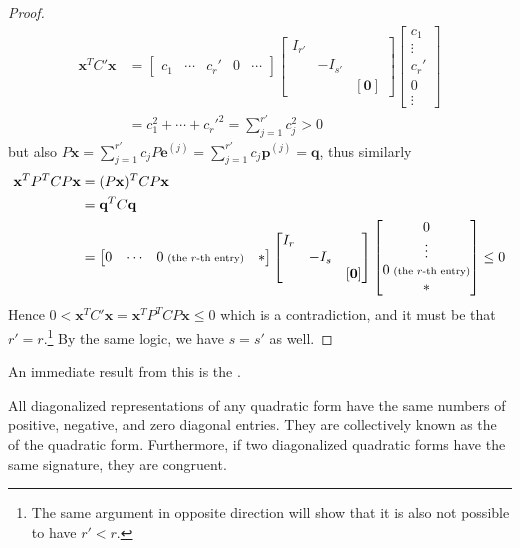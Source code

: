 \begin{proof}
\begin{align*}
\textbf{x}^T C'\textbf{x} &= 
\begin{bmatrix}
c_1 & \cdots & c_r' & 0 & \cdots  
\end{bmatrix}
\begin{bmatrix}
I_{r'} & & \\
& -I_{s'} &  \\
& & [\textbf{0}]
\end{bmatrix}
\begin{bmatrix}
c_1 \\
\vdots \\
c_r' \\
0 \\
\vdots
\end{bmatrix} \\
&= c_1^2 + \cdots + c_r'^2 = \sum_{j=1}^{r'} c_j^2 > 0   
\end{align*}
but also $P\textbf{x} = \sum_{j=1}^{r'} c_j P\textbf{e}^{(j)} = \sum_{j=1}^{r'} c_j \textbf{p}^{(j)} = \textbf{q}$, thus similarly
\begin{align*}
\textbf{x}^T P^T C P\textbf{x} &= (P\textbf{x})^T C P\textbf{x} \\
&= \textbf{q}^T C \textbf{q} \\
&= 
\begin{bmatrix}
0 & \cdots & 0 {\scriptsize \text{ (the $r$-th entry)}} & *
\end{bmatrix}
\begin{bmatrix}
I_r & & \\
& -I_s &  \\
& & [\textbf{0}]
\end{bmatrix}
\begin{bmatrix}
0 \\
\vdots \\
0 {\scriptsize \text{ (the $r$-th entry)}} \\
*
\end{bmatrix} \leq 0
\end{align*}
Hence $0 < \textbf{x}^T C'\textbf{x} = \textbf{x}^T P^T CP\textbf{x} \leq 0$ which is a contradiction, and it must be that $r' = r$.\footnote{The same argument in opposite direction will show that it is also not possible to have $r' < r$.} By the same logic, we have $s = s'$ as well.
\end{proof}
An immediate result from this is the .
\begin{thm}
\label{thm:sylvester}
All diagonalized representations of any quadratic form have the same numbers of positive, negative, and zero diagonal entries. They are collectively known as the  of the quadratic form. Furthermore, if two diagonalized quadratic forms have the same signature, they are congruent.
\end{thm}
